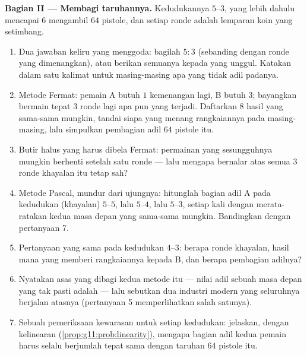 \begin{problem}
\medskip
\noindent\textbf{Bagian II --- Membagi taruhannya.}
Kedudukannya $5$--$3$, yang lebih dahulu mencapai $6$ mengambil $64$ pistole,
dan setiap ronde adalah lemparan koin yang setimbang.
\begin{enumerate}[resume]
  \item Dua jawaban keliru yang menggoda: bagilah $5 : 3$
        (sebanding dengan ronde yang dimenangkan), atau berikan semuanya kepada
        yang unggul. Katakan dalam satu kalimat untuk masing-masing apa yang
        tidak adil padanya.
  \item Metode Fermat: pemain A butuh $1$ kemenangan lagi, B butuh
        $3$; bayangkan bermain tepat $3$ ronde lagi apa pun yang terjadi.
        Daftarkan $8$ hasil yang sama-sama mungkin, tandai siapa yang menang
        rangkaiannya pada masing-masing, lalu simpulkan pembagian adil $64$
        pistole itu.
  \item Butir halus yang harus dibela Fermat: permainan yang sesungguhnya
        mungkin berhenti setelah satu ronde --- lalu mengapa bernalar atas
        semua $3$ ronde khayalan itu tetap sah?
  \item Metode Pascal, mundur dari ujungnya: hitunglah bagian adil A pada
        kedudukan (khayalan) $5$--$5$, lalu $5$--$4$, lalu $5$--$3$, setiap
        kali dengan merata-ratakan kedua masa depan yang sama-sama mungkin.
        Bandingkan dengan pertanyaan 7.
  \item Pertanyaan yang sama pada kedudukan $4$--$3$: berapa ronde khayalan,
        hasil mana yang memberi rangkaiannya kepada B, dan berapa pembagian
        adilnya?
  \item Nyatakan asas yang dibagi kedua metode itu --- nilai adil sebuah
        masa depan yang tak pasti adalah \emph{} ---
        lalu sebutkan dua industri modern yang seluruhnya berjalan atasnya
        (pertanyaan 5 memperlihatkan salah satunya).
  \item Sebuah pemeriksaan kewarasan untuk setiap kedudukan: jelaskan, dengan
        kelinearan 
        (\cref{prop:g11:prob:linearity}), mengapa bagian adil kedua pemain
        harus selalu berjumlah tepat sama dengan taruhan
        $64$ pistole itu.
\end{enumerate}


\end{problem}
